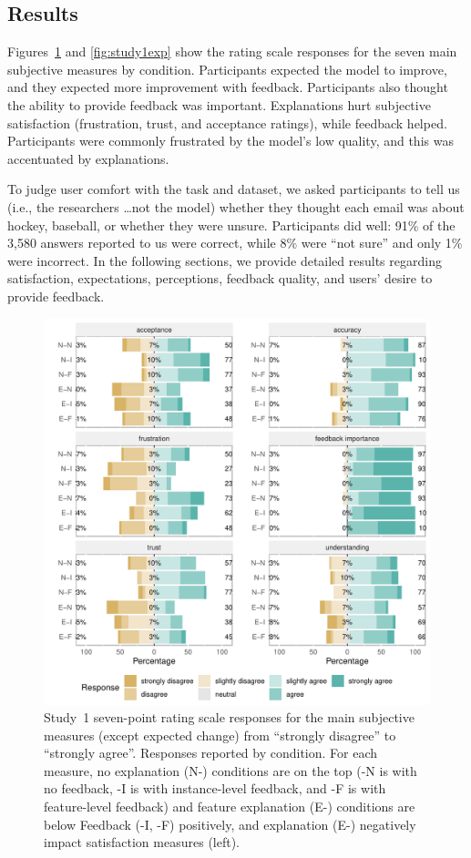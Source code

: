 


\subsection{Results}
Figures~\ref{fig:study1measures} and \ref{fig:study1exp} show the rating scale responses for the seven main subjective measures by condition. 
%
Participants expected the model to improve, and they expected more improvement with feedback. Participants also thought the ability to provide feedback was important. 
%
Explanations hurt subjective satisfaction (frustration, trust, and acceptance ratings), while feedback helped.
%
Participants were commonly frustrated by the model's low quality, and this was accentuated by explanations. 

To judge user comfort with the task and dataset, we asked participants to tell us (i.e., the researchers \dots not the model) whether they thought each email was about hockey, baseball, or whether they were unsure.
%
Participants did well: 91\% of the 3,580 answers reported to us were correct, while 8\% were ``not sure'' and only 1\% were incorrect. In the following sections, we provide detailed results regarding satisfaction, expectations, perceptions, feedback quality, and users' desire to provide feedback.

\begin{figure}[t]
    \includegraphics[width=\linewidth]{2020_chi_explanation/figures/study1-measures}
    \caption{Study~1 seven-point rating scale responses for the main subjective measures (except expected change) from ``strongly disagree'' to
``strongly agree''. Responses reported by condition. For each measure,
no explanation (N-) conditions are on the top (-N is with no feedback, -I
is with instance-level feedback, and -F is with feature-level feedback) and
feature explanation (E-) conditions are below Feedback (-I, -F) positively,
and explanation (E-) negatively impact satisfaction measures (left).}
\label{fig:study1measures}
\end{figure}

